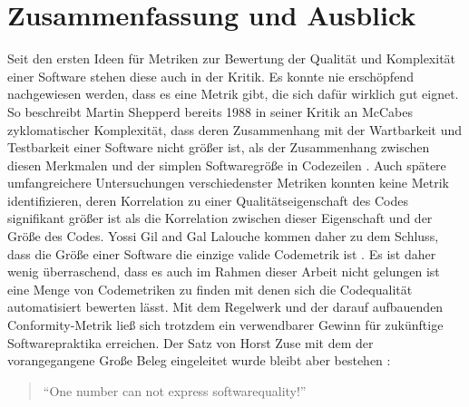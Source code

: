\documentclass[da,ngerman]{stthesis}
\begin{document}
  	\chapter{Zusammenfassung und Ausblick}
  		Seit den ersten Ideen für Metriken zur Bewertung der Qualität und Komplexität einer Software stehen diese auch in der Kritik. Es konnte nie erschöpfend nachgewiesen werden, dass es eine Metrik gibt, die sich dafür wirklich gut eignet. So beschreibt Martin Shepperd bereits 1988 in seiner Kritik an McCabes zyklomatischer Komplexität, dass deren Zusammenhang mit der Wartbarkeit und Testbarkeit einer Software nicht größer ist, als der Zusammenhang zwischen diesen Merkmalen und der simplen Softwaregröße in Codezeilen \cite{McCabeCritique}. \newline
  		Auch spätere umfangreichere Untersuchungen verschiedenster Metriken konnten keine Metrik identifizieren, deren Korrelation zu einer Qualitätseigenschaft des Codes signifikant größer ist als die Korrelation zwischen dieser Eigenschaft und der Größe des Codes. Yossi Gil and Gal Lalouche kommen daher zu dem Schluss, dass die Größe einer Software die einzige valide Codemetrik ist \cite{SizeOnlyMetric}. \newline
  		Es ist daher wenig überraschend, dass es auch im Rahmen dieser Arbeit nicht gelungen ist eine Menge von Codemetriken zu finden mit denen sich die Codequalität automatisiert bewerten lässt. Mit dem Regelwerk und der darauf aufbauenden Conformity-Metrik ließ sich trotzdem ein verwendbarer Gewinn für zukünftige Softwarepraktika erreichen. Der Satz von Horst Zuse mit dem der vorangegangene Große Beleg eingeleitet wurde bleibt aber bestehen \cite{FrameworkSoftwareMeasurement}:
  		\begin{quote}
  			"`One number can not express softwarequality!"'
  		\end{quote} 
\end{document}

